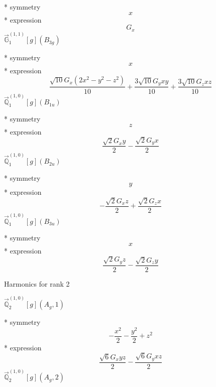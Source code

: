 \documentclass[fleqn,8pt]{jsarticle}
\begin{document}
\noindent\quad ** symmetry
\begin{dmath*}
x
\end{dmath*}
\noindent\quad ** expression
\begin{dmath*}
G_{x}
\end{dmath*}
\noindent\quad $\vec{\mathbb{G}}_{1}^{(1,1)}[g](B_{3g})$

\noindent\quad ** symmetry
\begin{dmath*}
x
\end{dmath*}
\noindent\quad ** expression
\begin{dmath*}
\frac{\sqrt{10} G_{x} \left(2 x^{2} - y^{2} - z^{2}\right)}{10} + \frac{3 \sqrt{10} G_{y} x y}{10} + \frac{3 \sqrt{10} G_{z} x z}{10}
\end{dmath*}
\noindent\quad $\vec{\mathbb{Q}}_{1}^{(1,0)}[g](B_{1u})$

\noindent\quad ** symmetry
\begin{dmath*}
z
\end{dmath*}
\noindent\quad ** expression
\begin{dmath*}
\frac{\sqrt{2} G_{x} y}{2} - \frac{\sqrt{2} G_{y} x}{2}
\end{dmath*}
\noindent\quad $\vec{\mathbb{Q}}_{1}^{(1,0)}[g](B_{2u})$

\noindent\quad ** symmetry
\begin{dmath*}
y
\end{dmath*}
\noindent\quad ** expression
\begin{dmath*}
- \frac{\sqrt{2} G_{x} z}{2} + \frac{\sqrt{2} G_{z} x}{2}
\end{dmath*}
\noindent\quad $\vec{\mathbb{Q}}_{1}^{(1,0)}[g](B_{3u})$

\noindent\quad ** symmetry
\begin{dmath*}
x
\end{dmath*}
\noindent\quad ** expression
\begin{dmath*}
\frac{\sqrt{2} G_{y} z}{2} - \frac{\sqrt{2} G_{z} y}{2}
\end{dmath*}

\noindent * Harmonics for rank 2

\noindent\quad $\vec{\mathbb{Q}}_{2}^{(1,0)}[g](A_{g},1)$

\noindent\quad ** symmetry
\begin{dmath*}
- \frac{x^{2}}{2} - \frac{y^{2}}{2} + z^{2}
\end{dmath*}
\noindent\quad ** expression
\begin{dmath*}
\frac{\sqrt{6} G_{x} y z}{2} - \frac{\sqrt{6} G_{y} x z}{2}
\end{dmath*}
\noindent\quad $\vec{\mathbb{Q}}_{2}^{(1,0)}[g](A_{g},2)$
\end{document}
